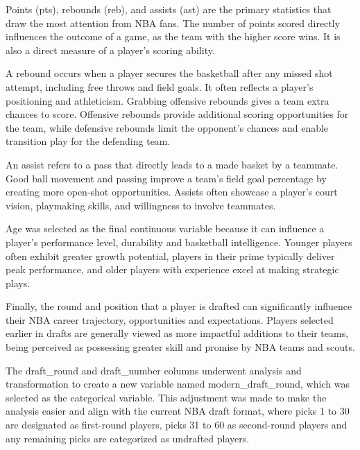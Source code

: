 \documentclass[
]{article}
\begin{document}
Points (pts), rebounds (reb), and assists (ast) are the primary
statistics that draw the most attention from NBA fans. The number of
points scored directly influences the outcome of a game, as the team
with the higher score wins. It is also a direct measure of a player's
scoring ability.

A rebound occurs when a player secures the basketball after any missed
shot attempt, including free throws and field goals. It often reflects a
player's positioning and athleticism. Grabbing offensive rebounds gives
a team extra chances to score. Offensive rebounds provide additional
scoring opportunities for the team, while defensive rebounds limit the
opponent's chances and enable transition play for the defending team.

An assist refers to a pass that directly leads to a made basket by a
teammate. Good ball movement and passing improve a team's field goal
percentage by creating more open-shot opportunities. Assists often
showcase a player's court vision, playmaking skills, and willingness to
involve teammates.

Age was selected as the final continuous variable because it can
influence a player's performance level, durability and basketball
intelligence. Younger players often exhibit greater growth potential,
players in their prime typically deliver peak performance, and older
players with experience excel at making strategic plays.

Finally, the round and position that a player is drafted can
significantly influence their NBA career trajectory, opportunities and
expectations. Players selected earlier in drafts are generally viewed as
more impactful additions to their teams, being perceived as possessing
greater skill and promise by NBA teams and scouts.

The draft\_round and draft\_number columns underwent analysis and
transformation to create a new variable named modern\_draft\_round,
which was selected as the categorical variable. This adjustment was made
to make the analysis easier and align with the current NBA draft format,
where picks 1 to 30 are designated as first-round players, picks 31 to
60 as second-round players and any remaining picks are categorized as
undrafted players.
\end{document}
